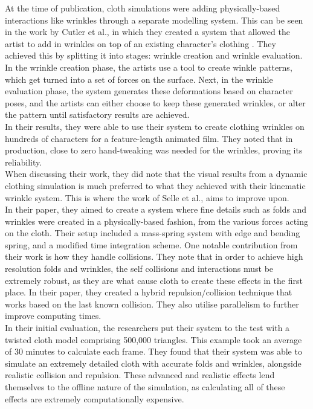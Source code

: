 \documentclass[12pt,a4paper]{article}
\begin{document}
At the time of publication, cloth simulations were adding physically-based interactions like wrinkles through a separate modelling system. This can be seen in the work by Cutler et al., in which they created a system that allowed the artist to add in wrinkles on top of an existing character's clothing \cite{10.1145/1073368.1073384}. They achieved this by splitting it into stages: wrinkle creation and wrinkle evaluation. In the wrinkle creation phase, the artists use a tool to create winkle patterns, which get turned into a set of forces on the surface. Next, in the wrinkle evaluation phase, the system generates these deformations based on character poses, and the artists can either choose to keep these generated wrinkles, or alter the pattern until satisfactory results are achieved.\\
In their results, they were able to use their system to create clothing wrinkles on hundreds of characters for a feature-length animated film. They noted that in production, close to zero hand-tweaking was needed for the wrinkles, proving its reliability.\\
When discussing their work, they did note that the visual results from a dynamic clothing simulation is much preferred to what they achieved with their kinematic wrinkle system. This is where the work of Selle et al., aims to improve upon. \\

In their paper, they aimed to create a system where fine details such as folds and wrinkles were created in a physically-based fashion, from the various forces acting on the cloth. Their setup included a mass-spring system with edge and bending spring, and a modified time integration scheme. One notable contribution from their work is how they handle collisions. They note that in order to achieve high resolution folds and wrinkles, the self collisions and interactions must be extremely robust, as they are what cause cloth to create these effects in the first place. In their paper, they created a hybrid repulsion/collision technique that works based on the last known collision. They also utilise parallelism to further improve computing times.\\
In their initial evaluation, the researchers put their system to the test with a twisted cloth model comprising 500,000 triangles.  This example took an average of 30 minutes to calculate each frame. They found that their system was able to simulate an extremely detailed cloth with accurate folds and wrinkles, alongside realistic collision and repulsion. These advanced and realistic effects lend themselves to the offline nature of the simulation, as calculating all of these effects are extremely computationally expensive.
\end{document}
